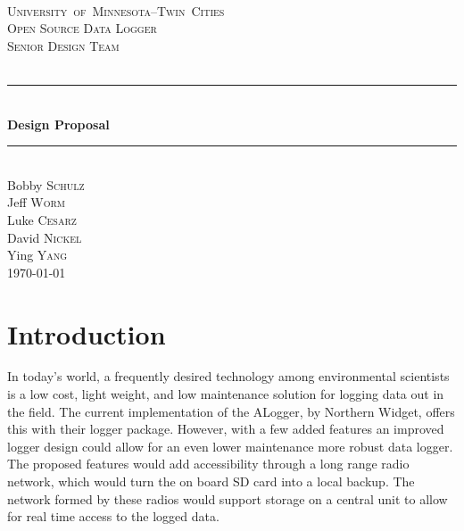 \documentclass[12pt]{article}
\begin{document}
\renewcommand{\thefootnote}{\fnsymbol{footnote}}
\begin{titlepage}

\newcommand{\HRule}{\rule{\linewidth}{0.5mm}}

\center


~\\[3cm]
\mbox{\textsc{\LARGE University of Minnesota--Twin Cities}}\\[1.5cm]
\textsc{\Large Open Source Data Logger \\[0.25cm]  Senior Design Team}\\[0.5cm]
\textsc{}\\[0.5cm]


\HRule \\[0.4cm]
{ \Large \bfseries Design Proposal}\\[0cm]
\HRule \\[2.4cm]


\large Bobby \textsc{Schulz}\\
\large Jeff \textsc{Worm}\\
\large Luke \textsc{Cesarz}\\
\large David \textsc{Nickel}\\
\large Ying \textsc{Yang}\\[5cm]



{\large \today}\\[3cm]

\end{titlepage}

\section{Introduction}
In today's world, a frequently desired technology among environmental scientists is a low cost, light weight, and low maintenance solution for logging data out in the field. The current implementation of the ALogger, by Northern Widget, offers this with their logger package. However, with a few added features an improved logger design could allow for an even lower maintenance more robust data logger. The proposed features would add accessibility through a long range radio network, which would turn the on board SD card into a local backup. The network formed by these radios would support storage on a central unit to allow for real time access to the logged data. 
\end{document}
